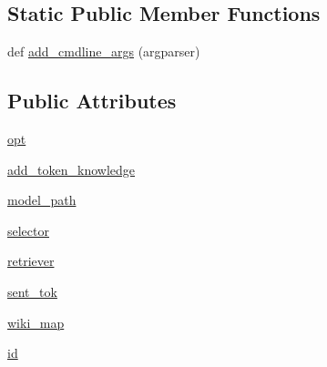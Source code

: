 \subsection*{Static Public Member Functions}
\begin{DoxyCompactItemize}
\item 
def \hyperlink{classprojects_1_1wizard__of__wikipedia_1_1knowledge__retriever_1_1knowledge__retriever_1_1KnowledgeRetrieverAgent_a64886f913a246709fec34c1895d1d88b}{add\+\_\+cmdline\+\_\+args} (argparser)
\end{DoxyCompactItemize}
\subsection*{Public Attributes}
\begin{DoxyCompactItemize}
\item 
\hyperlink{classprojects_1_1wizard__of__wikipedia_1_1knowledge__retriever_1_1knowledge__retriever_1_1KnowledgeRetrieverAgent_a6869be2c3be40d0ccac44b6b19357f26}{opt}
\item 
\hyperlink{classprojects_1_1wizard__of__wikipedia_1_1knowledge__retriever_1_1knowledge__retriever_1_1KnowledgeRetrieverAgent_a844234360c751d35f7cbd55f6e40eb88}{add\+\_\+token\+\_\+knowledge}
\item 
\hyperlink{classprojects_1_1wizard__of__wikipedia_1_1knowledge__retriever_1_1knowledge__retriever_1_1KnowledgeRetrieverAgent_af2a0ab10072155f6bbebf166f8e7fb1f}{model\+\_\+path}
\item 
\hyperlink{classprojects_1_1wizard__of__wikipedia_1_1knowledge__retriever_1_1knowledge__retriever_1_1KnowledgeRetrieverAgent_ada9a4811fa4123242270fc9da2b740bd}{selector}
\item 
\hyperlink{classprojects_1_1wizard__of__wikipedia_1_1knowledge__retriever_1_1knowledge__retriever_1_1KnowledgeRetrieverAgent_aed292bc6d233711f3a365438f17f07b8}{retriever}
\item 
\hyperlink{classprojects_1_1wizard__of__wikipedia_1_1knowledge__retriever_1_1knowledge__retriever_1_1KnowledgeRetrieverAgent_a1c0bf41e2cddb1265a1ef06854309245}{sent\+\_\+tok}
\item 
\hyperlink{classprojects_1_1wizard__of__wikipedia_1_1knowledge__retriever_1_1knowledge__retriever_1_1KnowledgeRetrieverAgent_ab448fa581f073b320b5fc1d678db1862}{wiki\+\_\+map}
\item 
\hyperlink{classprojects_1_1wizard__of__wikipedia_1_1knowledge__retriever_1_1knowledge__retriever_1_1KnowledgeRetrieverAgent_a93d3e411a4309ab826aec19d7f7554f1}{id}

\end{DoxyCompactItemize}
